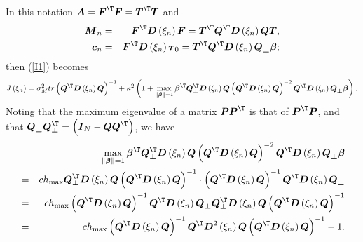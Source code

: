 \documentclass[times, authoryear, 12pt, twoside]{elsarticle}
\begin{document}
In this notation $\boldsymbol{A}=\boldsymbol{F}^{\T }\boldsymbol{F}=%
\boldsymbol{T}^{\T }\boldsymbol{T}$ and 
\begin{eqnarray*}
\boldsymbol{M}_{n} &=&\boldsymbol{F}^{\T }\boldsymbol{D}\left( \xi
_{n}\right) \boldsymbol{F}=\boldsymbol{T}^{\T }\boldsymbol{Q}^{\T }%
\boldsymbol{D}\left( \xi _{n}\right) \boldsymbol{QT}, \\
\boldsymbol{c}_{n} &=&\boldsymbol{F}^{\T }\boldsymbol{D}\left( \xi
_{n}\right) \boldsymbol{\tau }_{0}=\boldsymbol{T}^{\T }\boldsymbol{Q}%
^{\T }\boldsymbol{D}\left( \xi _{n}\right) \boldsymbol{Q}_{\boldsymbol{%
\perp }}{\boldsymbol{\beta }};
\end{eqnarray*}%
then (\ref{I1}) becomes%
\begin{equation}
J\left( \xi _{n}\right) =\sigma _{M}^{2}tr\left( \boldsymbol{Q}^{\T }%
\boldsymbol{D}\left( \xi _{n}\right) \boldsymbol{Q}\right) ^{-1}+\kappa
^{2}\left( 1+\max_{\left\Vert \boldsymbol{\beta }\right\Vert =1}\boldsymbol{%
\beta }^{\T }\boldsymbol{Q}_{\boldsymbol{\perp }}^{\T }\boldsymbol{D}%
\left( \xi _{n}\right) \boldsymbol{Q}\left( \boldsymbol{Q}^{\T }%
\boldsymbol{D}\left( \xi _{n}\right) \boldsymbol{Q}\right) ^{-2}\boldsymbol{Q%
}^{\T }\boldsymbol{D}\left( \xi _{n}\right) \boldsymbol{Q}_{\boldsymbol{%
\perp }}{\boldsymbol{\beta }}\right) .  \label{I2}
\end{equation}%
Noting that the maximum eigenvalue of a matrix $\boldsymbol{PP}^{\T }$
is that of $\boldsymbol{P}^{\T }\boldsymbol{P}$, and that $\boldsymbol{Q}%
_{\boldsymbol{\perp }}\boldsymbol{Q}_{\boldsymbol{\perp }}^{\T }=\left( 
\boldsymbol{I}_{N}-\boldsymbol{QQ}^{\T }\right) $, we have 
\begin{eqnarray*}
&&\max_{\left\Vert \boldsymbol{\beta }\right\Vert =1}\boldsymbol{\beta }%
^{\T }\boldsymbol{Q}_{\boldsymbol{\perp }}^{\T }\boldsymbol{D}\left(
\xi _{n}\right) \boldsymbol{Q}\left( \boldsymbol{Q}^{\T }\boldsymbol{D}%
\left( \xi _{n}\right) \boldsymbol{Q}\right) ^{-2}\boldsymbol{Q}^{\T }%
\boldsymbol{D}\left( \xi _{n}\right) \boldsymbol{Q}_{\boldsymbol{\perp }}%
\boldsymbol{\beta } \\
&=&ch_{\max }\boldsymbol{Q}_{\boldsymbol{\perp }}^{\T }\boldsymbol{D}%
\left( \xi _{n}\right) \boldsymbol{Q}\left( \boldsymbol{Q}^{\T }%
\boldsymbol{D}\left( \xi _{n}\right) \boldsymbol{Q}\right) ^{-1}\cdot \left( 
\boldsymbol{Q}^{\T }\boldsymbol{D}\left( \xi _{n}\right) \boldsymbol{Q}%
\right) ^{-1}\boldsymbol{Q}^{\T }\boldsymbol{D}\left( \xi _{n}\right) 
\boldsymbol{Q}_{\boldsymbol{\perp }} \\
&=&ch_{\max }\left( \boldsymbol{Q}^{\T }\boldsymbol{D}\left( \xi
_{n}\right) \boldsymbol{Q}\right) ^{-1}\boldsymbol{Q}^{\T }\boldsymbol{D}%
\left( \xi _{n}\right) \boldsymbol{Q}_{\boldsymbol{\perp }}\boldsymbol{Q}_{%
\boldsymbol{\perp }}^{\T }\boldsymbol{D}\left( \xi _{n}\right) 
\boldsymbol{Q}\left( \boldsymbol{Q}^{\T }\boldsymbol{D}\left( \xi
_{n}\right) \boldsymbol{Q}\right) ^{-1} \\
&=&ch_{\max }\left( \boldsymbol{Q}^{\T }\boldsymbol{D}\left( \xi
_{n}\right) \boldsymbol{Q}\right) ^{-1}\boldsymbol{Q}^{\T }\boldsymbol{D}%
^{2}\left( \xi _{n}\right) \boldsymbol{Q%
}\left( \boldsymbol{Q}^{\T }\boldsymbol{D}\left( \xi _{n}\right) 
\boldsymbol{Q}\right) ^{-1}-1.
\end{eqnarray*}%
\end{document}
